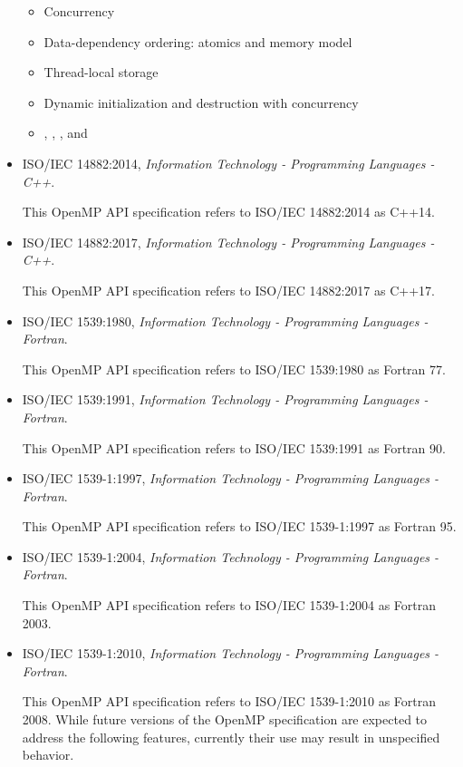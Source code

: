 \begin{itemize}
\begin{itemize}
\item Concurrency
\item Data-dependency ordering: atomics and memory model
\item Thread-local storage
\item Dynamic initialization and destruction with concurrency
\item {}, , ,
   and 
\end{itemize}

\item ISO/IEC 14882:2014, \textsl{Information Technology - Programming Languages - C++}.

This OpenMP API specification refers to ISO/IEC 14882:2014 as C++14. 

\item ISO/IEC 14882:2017, \textsl{Information Technology - Programming Languages - C++}.

This OpenMP API specification refers to ISO/IEC 14882:2017 as
C++17. 

\item ISO/IEC 1539:1980, \textsl{Information Technology - Programming Languages - Fortran}.

This OpenMP API specification refers to ISO/IEC 1539:1980 as Fortran 77.

\item ISO/IEC 1539:1991, \textsl{Information Technology - Programming Languages - Fortran}.

This OpenMP API specification refers to ISO/IEC 1539:1991 as Fortran 90.

\item ISO/IEC 1539-1:1997, \textsl{Information Technology - Programming Languages - Fortran}.

This OpenMP API specification refers to ISO/IEC 1539-1:1997 as Fortran 95.

\item ISO/IEC 1539-1:2004, \textsl{Information Technology - Programming Languages - Fortran}.

This OpenMP API specification refers to ISO/IEC 1539-1:2004 as Fortran 2003.

\item ISO/IEC 1539-1:2010, \textsl{Information Technology - Programming Languages - Fortran}.

This OpenMP API specification refers to ISO/IEC 1539-1:2010 as Fortran 2008. 
While future versions of the OpenMP specification are expected to
address the following features, currently their use may result in
unspecified behavior.


\end{itemize}
